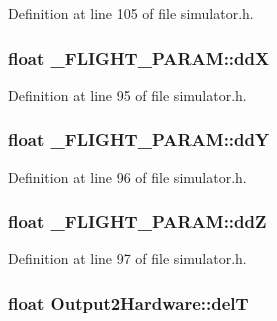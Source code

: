 \-Definition at line 105 of file simulator.\-h.

\hypertarget{group___h_i_t_l_plugin_gabb56dcac3d6e652f79e4a2fd79322e66}{
\subsubsection[{dd\-X}]{\setlength{\rightskip}{0pt plus 5cm}float {\bf \-\_\-\-F\-L\-I\-G\-H\-T\-\_\-\-P\-A\-R\-A\-M\-::dd\-X}}}\label{group___h_i_t_l_plugin_gabb56dcac3d6e652f79e4a2fd79322e66}


\-Definition at line 95 of file simulator.\-h.

\hypertarget{group___h_i_t_l_plugin_ga076f6e2f6b3ce2a8f01d26b3a7dac1bd}{
\subsubsection[{dd\-Y}]{\setlength{\rightskip}{0pt plus 5cm}float {\bf \-\_\-\-F\-L\-I\-G\-H\-T\-\_\-\-P\-A\-R\-A\-M\-::dd\-Y}}}\label{group___h_i_t_l_plugin_ga076f6e2f6b3ce2a8f01d26b3a7dac1bd}


\-Definition at line 96 of file simulator.\-h.

\hypertarget{group___h_i_t_l_plugin_ga7961abcc14db01ab5ba42c426e2160c5}{
\subsubsection[{dd\-Z}]{\setlength{\rightskip}{0pt plus 5cm}float {\bf \-\_\-\-F\-L\-I\-G\-H\-T\-\_\-\-P\-A\-R\-A\-M\-::dd\-Z}}}\label{group___h_i_t_l_plugin_ga7961abcc14db01ab5ba42c426e2160c5}


\-Definition at line 97 of file simulator.\-h.

\hypertarget{group___h_i_t_l_plugin_gadbdb09f62a5ce0e914e8551ce3bd0bbd}{
\subsubsection[{del\-T}]{\setlength{\rightskip}{0pt plus 5cm}float {\bf \-Output2\-Hardware\-::del\-T}}}\label{group___h_i_t_l_plugin_gadbdb09f62a5ce0e914e8551ce3bd0bbd}


